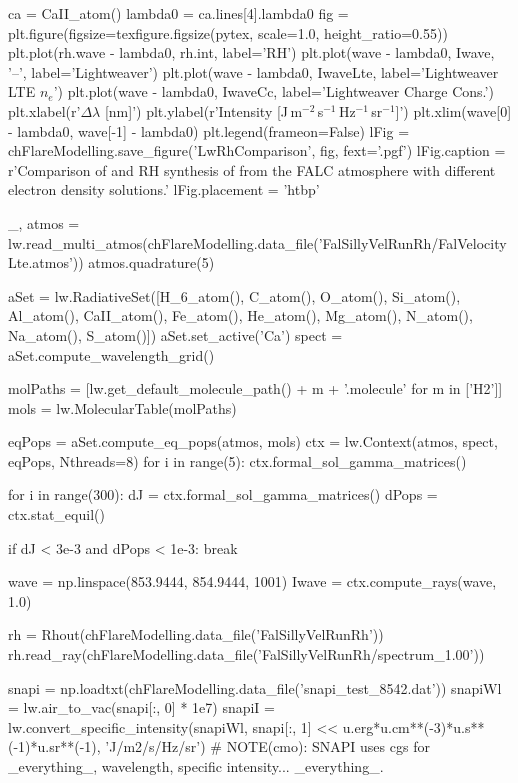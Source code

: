 \begin{pycode}[FlareModelling]
ca = CaII_atom()
lambda0 = ca.lines[4].lambda0
fig = plt.figure(figsize=texfigure.figsize(pytex, scale=1.0, height_ratio=0.55))
plt.plot(rh.wave - lambda0, rh.int, label='RH')
plt.plot(wave - lambda0, Iwave, '--', label='Lightweaver')
plt.plot(wave - lambda0, IwaveLte, label='Lightweaver LTE $n_e$')
plt.plot(wave - lambda0, IwaveCc, label='Lightweaver Charge Cons.')
plt.xlabel(r'$\Delta\lambda$ [nm]')
plt.ylabel(r'Intensity [J\,m$^{-2}$\,s$^{-1}$\,Hz$^{-1}$\,sr$^{-1}$]')
plt.xlim(wave[0] - lambda0, wave[-1] - lambda0)
plt.legend(frameon=False)
lFig = chFlareModelling.save_figure('LwRhComparison', fig, fext='.pgf')
lFig.caption = r'Comparison of \Lw{} and RH synthesis of \CaLine{} from the FALC atmosphere with different electron density solutions.'
lFig.placement = 'htbp'
\end{pycode}
\begin{pycode}[FlareModelling]

_, atmos = lw.read_multi_atmos(chFlareModelling.data_file('FalSillyVelRunRh/FalVelocityLte.atmos'))
atmos.quadrature(5)

aSet = lw.RadiativeSet([H_6_atom(), C_atom(), O_atom(), Si_atom(), Al_atom(),
                        CaII_atom(), Fe_atom(), He_atom(), Mg_atom(), N_atom(),
                        Na_atom(), S_atom()])
aSet.set_active('Ca')
spect = aSet.compute_wavelength_grid()

molPaths = [lw.get_default_molecule_path() + m + '.molecule' for m in ['H2']]
mols = lw.MolecularTable(molPaths)

eqPops = aSet.compute_eq_pops(atmos, mols)
ctx = lw.Context(atmos, spect, eqPops, Nthreads=8)
for i in range(5):
    ctx.formal_sol_gamma_matrices()

for i in range(300):
    dJ = ctx.formal_sol_gamma_matrices()
    dPops = ctx.stat_equil()

    if dJ < 3e-3 and dPops < 1e-3:
        break

wave = np.linspace(853.9444, 854.9444, 1001)
Iwave = ctx.compute_rays(wave, 1.0)

rh = Rhout(chFlareModelling.data_file('FalSillyVelRunRh'))
rh.read_ray(chFlareModelling.data_file('FalSillyVelRunRh/spectrum_1.00'))

snapi = np.loadtxt(chFlareModelling.data_file('snapi_test_8542.dat'))
snapiWl = lw.air_to_vac(snapi[:, 0] * 1e7)
snapiI = lw.convert_specific_intensity(snapiWl,
                                       snapi[:, 1] << u.erg*u.cm**(-3)*u.s**(-1)*u.sr**(-1),
                                       'J/m2/s/Hz/sr')
# NOTE(cmo): SNAPI uses cgs for _everything_, wavelength, specific intensity... _everything_.


\end{pycode}

